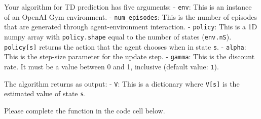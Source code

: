 \documentclass[11pt]{article}
\begin{document}
Your algorithm for TD prediction has five arguments: - \texttt{env}:
This is an instance of an OpenAI Gym environment. -
\texttt{num\_episodes}: This is the number of episodes that are
generated through agent-environment interaction. - \texttt{policy}: This
is a 1D numpy array with \texttt{policy.shape} equal to the number of
states (\texttt{env.nS}). \texttt{policy{[}s{]}} returns the action that
the agent chooses when in state \texttt{s}. - \texttt{alpha}: This is
the step-size parameter for the update step. - \texttt{gamma}: This is
the discount rate. It must be a value between 0 and 1, inclusive
(default value: \texttt{1}).

The algorithm returns as output: - \texttt{V}: This is a dictionary
where \texttt{V{[}s{]}} is the estimated value of state \texttt{s}.

Please complete the function in the code cell below.
\end{document}

